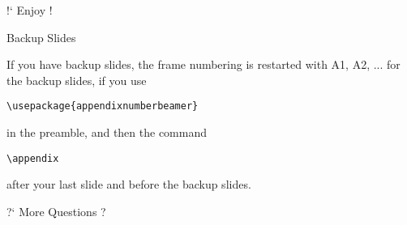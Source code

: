 \documentclass{beamer}
\begin{document}
\begin{frame}{}

  \centering\Huge
  !` Enjoy !
\end{frame}

\appendix
\begin{frame}[fragile]{Backup Slides}

  
  \begin{block}{}
    If you have backup slides, the frame numbering is restarted with
    A1, A2, ... for the backup slides, if you use

    
\begin{verbatim}
\usepackage{appendixnumberbeamer}
\end{verbatim}

    in the preamble, and then the command
\begin{verbatim}
\appendix
\end{verbatim}

    after your last slide and before the backup slides. 
  \end{block}

\end{frame}

\begin{frame}{}
  \centering\Huge
  ?` More Questions ?
\end{frame}

\end{document}
